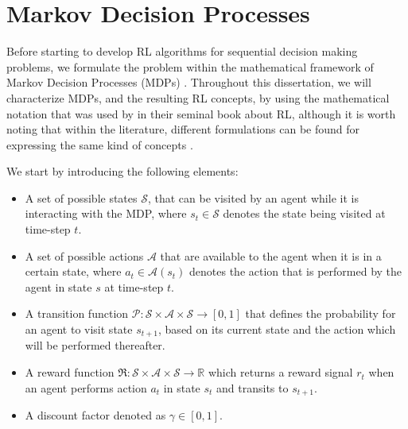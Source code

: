 \section{Markov Decision Processes}
\label{sec:mdps}

Before starting to develop RL algorithms for sequential decision making problems, we formulate the problem within the mathematical framework of Markov Decision Processes (MDPs) \cite{puterman1990markov,puterman2014markov}. Throughout this dissertation, we will characterize MDPs, and the resulting RL concepts, by using the mathematical notation that was used by \citet{sutton2018reinforcement} in their seminal book about RL, although it is worth noting that within the literature, different formulations can be found for expressing the same kind of concepts \cite{bertsekas1995neuro,busoniu2010reinforcement,bertsekas2000dynamic,bertsekas2019reinforcement}.

We start by introducing the following elements:
\begin{itemize}
	\item A set of possible states $\mathcal{S}$, that can be visited by an agent while it is interacting with the MDP, where $s_t \in \mathcal{S}$ denotes the state being visited at time-step $t$.
	\item A set of possible actions $\mathcal{A}$ that are available to the agent when it is in a certain state, where $a_t \in \mathcal{A}(s_t)$ denotes the action that is performed by the agent in state $s$ at time-step $t$.
\item A transition function $\mathcal{P}:\mathcal{S}\times\mathcal{A}\times\mathcal{S}\rightarrow [0,1]$ that defines the probability for an agent to visit state $s_{t+1}$, based on its current state and the action which will be performed thereafter.
\item A reward function $\Re:\mathcal{S}\times\mathcal{A}\times\mathcal{S}\rightarrow \mathbb{R}$ which returns a reward signal $r_{t}$ when an agent performs action $a_t$ in state $s_t$ and transits to $s_{t+1}$.
\item A discount factor denoted as $\gamma \in [0,1]$.

\end{itemize}

